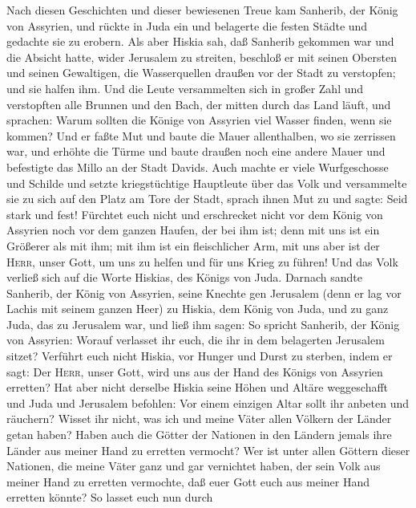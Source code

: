  Nach diesen Geschichten und dieser bewiesenen Treue kam
Sanherib, der König von Assyrien, und rückte in Juda ein und belagerte
die festen Städte und gedachte sie zu erobern.  Als aber
Hiskia sah, daß Sanherib gekommen war und die Absicht hatte, wider
Jerusalem zu streiten,  beschloß er mit seinen Obersten
und seinen Gewaltigen, die Wasserquellen draußen vor der Stadt zu
verstopfen; und sie halfen ihm.  Und die Leute
versammelten sich in großer Zahl und verstopften alle Brunnen und den
Bach, der mitten durch das Land läuft, und sprachen: Warum sollten die
Könige von Assyrien viel Wasser finden, wenn sie kommen? 
Und er faßte Mut und baute die Mauer allenthalben, wo sie zerrissen war,
und erhöhte die Türme und baute draußen noch eine andere Mauer und
befestigte das Millo an der Stadt Davids. Auch machte er viele
Wurfgeschosse und Schilde  und setzte kriegstüchtige
Hauptleute über das Volk und versammelte sie zu sich auf den Platz am
Tore der Stadt, sprach ihnen Mut zu und sagte:  Seid stark
und fest! Fürchtet euch nicht und erschrecket nicht vor dem König von
Assyrien noch vor dem ganzen Haufen, der bei ihm ist; denn mit uns ist
ein Größerer als mit ihm;  mit ihm ist ein fleischlicher
Arm, mit uns aber ist der \textsc{Herr}, unser Gott, um uns zu helfen
und für uns Krieg zu führen! Und das Volk verließ sich auf die Worte
Hiskias, des Königs von Juda.  Darnach sandte Sanherib,
der König von Assyrien, seine Knechte gen Jerusalem (denn er lag vor
Lachis mit seinem ganzen Heer) zu Hiskia, dem König von Juda, und zu
ganz Juda, das zu Jerusalem war, und ließ ihm sagen:  So
spricht Sanherib, der König von Assyrien: Worauf verlasset ihr euch, die
ihr in dem belagerten Jerusalem sitzet?  Verführt euch
nicht Hiskia, vor Hunger und Durst zu sterben, indem er sagt: Der
\textsc{Herr}, unser Gott, wird uns aus der Hand des Königs von Assyrien
erretten?  Hat aber nicht derselbe Hiskia seine Höhen und
Altäre weggeschafft und Juda und Jerusalem befohlen: Vor einem einzigen
Altar sollt ihr anbeten und räuchern?  Wisset ihr nicht,
was ich und meine Väter allen Völkern der Länder getan haben? Haben auch
die Götter der Nationen in den Ländern jemals ihre Länder aus meiner
Hand zu erretten vermocht?  Wer ist unter allen Göttern
dieser Nationen, die meine Väter ganz und gar vernichtet haben, der sein
Volk aus meiner Hand zu erretten vermochte, daß euer Gott euch aus
meiner Hand erretten könnte?  So lasset euch nun durch
